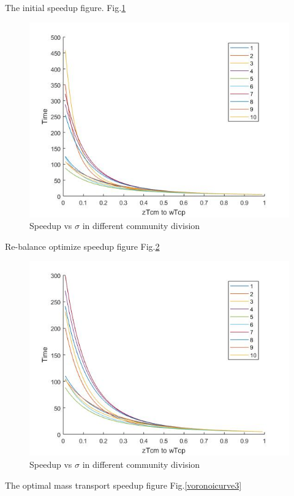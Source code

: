 The initial speedup figure. Fig.\ref{voronoicurve}
\\

\begin{figure}[h]
\centering\includegraphics[width=0.8\linewidth]{figure/voronoicurve}
\caption{Speedup vs $\sigma$ in different community division}
\label{voronoicurve}
\end{figure}


Re-balance optimize speedup figure Fig.\ref{voronoicurve2}
\\

\begin{figure}[h]
\centering\includegraphics[width=0.8\linewidth]{figure/voronoicurve2}
\caption{Speedup vs $\sigma$ in different community division}
\label{voronoicurve2}
\end{figure}


The optimal mass transport speedup figure Fig.\ref{voronoicurve3}
\\

